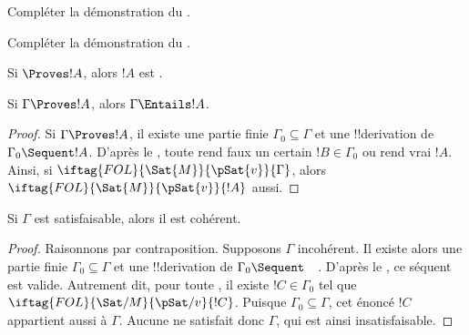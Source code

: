 \documentclass[../../../include/open-logic-section]{subfiles}
\begin{document}
\begin{prob}
Compléter la démonstration du .
\end{prob}
\tagendprob

\begin{prob}
Compléter la démonstration du .
\end{prob}
\tagendprob

\begin{cor}
Si $\Proves !A$, alors $!A$ est .
\end{cor}

\begin{cor}
Si $\Gamma \Proves !A$, alors $\Gamma \Entails !A$.
\end{cor}

\begin{proof}
Si $\Gamma \Proves !A$, il existe une partie finie
$\Gamma_0 \subseteq \Gamma$ et une !!{derivation} de
$\Gamma_0 \Sequent !A$. D'après le ,
toute 
rend faux un certain $!B \in \Gamma_0$ ou rend vrai $!A$.
Ainsi, si $\iftag{FOL}{\Sat{M}}{\pSat{v}}{\Gamma}$, alors
$\iftag{FOL}{\Sat{M}}{\pSat{v}}{!A}$ aussi.
\end{proof}

\begin{cor}
Si $\Gamma$ est satisfaisable, alors il est cohérent.
\end{cor}

\begin{proof}
Raisonnons par contraposition. Supposons $\Gamma$ incohérent.
Il existe alors une partie finie $\Gamma_0 \subseteq \Gamma$
et une !!{derivation} de $\Gamma_0 \Sequent \quad$.
D'après le , ce séquent est valide.
Autrement dit, pour toute
,
il existe $!C \in \Gamma_0$ tel que
$\iftag{FOL}{\Sat/{M}}{\pSat/{v}}{!C}$.
Puisque $\Gamma_0 \subseteq \Gamma$, cet énoncé $!C$ appartient
aussi à $\Gamma$. Aucune 
ne satisfait donc $\Gamma$, qui est ainsi insatisfaisable.
\end{proof}
\end{document}

